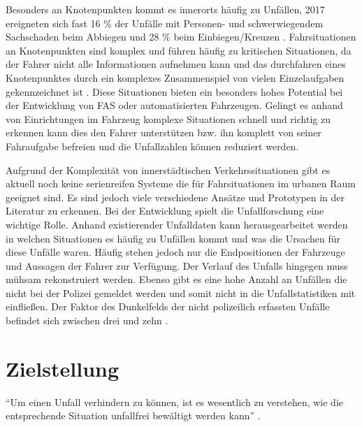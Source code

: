 Besonders an Knotenpunkten kommt es innerorts häufig zu Unfällen, 2017 ereigneten sich fast 16 \% der Unfälle mit Personen- und schwerwiegendem Sachschaden beim Abbiegen und 28 \% beim Einbiegen/Kreuzen \parencite[S. 68]{StatistischesBundesamt.2018b}. Fahrsituationen an Knotenpunkten sind komplex und führen häufig zu kritischen Situationen, da der Fahrer nicht alle Informationen aufnehmen kann \parencite[S. 2]{Gerstenberger.17.02.2015} und das durchfahren eines Knotenpunktes durch ein komplexes Zusammenspiel von vielen Einzelaufgaben gekennzeichnet ist \parencite[S. 51]{Zademach.24.09.2015}. Diese Situationen bieten ein besonders hohes Potential bei der Entwicklung von FAS oder automatisierten Fahrzeugen. Gelingt es anhand von Einrichtungen im Fahrzeug komplexe Situationen schnell und richtig zu erkennen kann dies den Fahrer unterstützen bzw. ihn komplett von seiner Fahraufgabe befreien und die Unfallzahlen können reduziert werden. 

Aufgrund der Komplexität von innerstädtischen Verkehrssituationen gibt es aktuell noch keine serienreifen Systeme die für Fahrsituationen im urbanen Raum geeignet sind. Es sind jedoch viele verschiedene Ansätze und Prototypen in der  Literatur zu erkennen. Bei der Entwicklung spielt die Unfallforschung eine wichtige Rolle. Anhand existierender Unfalldaten kann herausgearbeitet werden in welchen Situationen es häufig zu Unfällen kommt und was die Ursachen für diese Unfälle waren. Häufig stehen jedoch nur die Endpositionen der Fahrzeuge und Aussagen der Fahrer zur Verfügung. Der Verlauf des Unfalls hingegen muss mühsam rekonstruiert werden. Ebenso gibt es eine hohe Anzahl an Unfällen die nicht bei der Polizei gemeldet werden und somit nicht in die Unfallstatistiken mit einfließen. Der Faktor des Dunkelfelds der nicht polizeilich erfassten Unfälle befindet sich zwischen drei und zehn \parencite[S. 151]{Huguenin.2017}.

\section{Zielstellung}
\enquote{Um einen Unfall verhindern zu können, ist es wesentlich zu verstehen, wie die entsprechende Situation unfallfrei bewältigt werden kann} \parencite[S. 8]{Vollrath.2006}.

